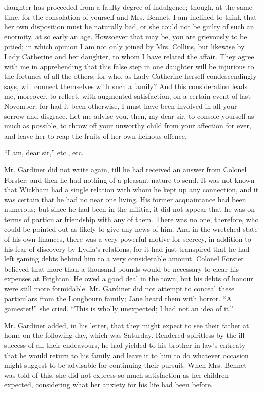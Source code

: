 \documentclass[12pt]{book}
\begin{document}
daughter has proceeded from a faulty degree of indulgence; though, at the same time, for the consolation of yourself and Mrs. Bennet, I am inclined to think that her own disposition must be naturally bad, or she could not be guilty of such an enormity, at so early an age. Howsoever that may be, you are grievously to be pitied; in which opinion I am not only joined by Mrs. Collins, but likewise by Lady Catherine and her daughter, to whom I have related the affair. They agree with me in apprehending that this false step in one daughter will be injurious to the fortunes of all the others: for who, as Lady Catherine herself condescendingly says, will connect themselves with such a family? And this consideration leads me, moreover, to reflect, with augmented satisfaction, on a certain event of last November; for had it been otherwise, I must have been involved in all your sorrow and disgrace. Let me advise you, then, my dear sir, to console yourself as much as possible, to throw off your unworthy child from your affection for ever, and leave her to reap the fruits of her own heinous offence.

``I am, dear sir,'' etc., etc.

Mr. Gardiner did not write again, till he had received an answer from Colonel Forster; and then he had nothing of a pleasant nature to send. It was not known that Wickham had a single relation with whom he kept up any connection, and it was certain that he had no near one living. His former acquaintance had been numerous; but since he had been in the militia, it did not appear that he was on terms of particular friendship with any of them. There was no one, therefore, who could be pointed out as likely to give any news of him. And in the wretched state of his own finances, there was a very powerful motive for secrecy, in addition to his fear of discovery by Lydia's relations; for it had just transpired that he had left gaming debts behind him to a very considerable amount. Colonel Forster believed that more than a thousand pounds would be necessary to clear his expenses at Brighton. He owed a good deal in the town, but his debts of honour were still more formidable. Mr. Gardiner did not attempt to conceal these particulars from the Longbourn family; Jane heard them with horror. ``A gamester!'' she cried. ``This is wholly unexpected; I had not an idea of it.''

Mr. Gardiner added, in his letter, that they might expect to see their father at home on the following day, which was Saturday. Rendered spiritless by the ill success of all their endeavours, he had yielded to his brother-in-law's entreaty that he would return to his family and leave it to him to do whatever occasion might suggest to be advisable for continuing their pursuit. When Mrs. Bennet was told of this, she did not express so much satisfaction as her children expected, considering what her anxiety for his life had been before.
\end{document}
